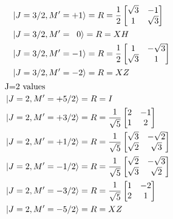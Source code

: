 \begin{subequations}
\begin{align}
\begin{split}
%
&\ket{J=3/2, M'=+1} = R = 
\frac{1}{2}
\begin{bmatrix}
\sqrt{3} &-1 \\
1 & \sqrt{3} \\
\end{bmatrix} \\
%
&\ket{J=3/2, M'=\;\;0} = R = XH \\
%
&\ket{J=3/2, M'=-1} = R = 
\frac{1}{2}
\begin{bmatrix}
1 &-\sqrt{3} \\
\sqrt{3} & 1 \\
\end{bmatrix} \\
%
&\ket{J=3/2, M'=-2} = R = XZ \\
\end{split} \\
\intertext{J=2 values}
\begin{split}
&\ket{J=2, M'=+5/2} = R = I \\
%
&\ket{J=2, M'=+3/2} = R = 
\frac{1}{\sqrt{5}}
\begin{bmatrix}
2 &-1 \\
1 & 2 \\
\end{bmatrix} \\
%
&\ket{J=2, M'=+1/2} = R = 
\frac{1}{\sqrt{5}}
\begin{bmatrix}
\sqrt{3} &-\sqrt{2} \\
\sqrt{2} & \sqrt{3} \\
\end{bmatrix} \\
%
&\ket{J=2, M'=-1/2} = R = 
\frac{1}{\sqrt{5}}
\begin{bmatrix}
\sqrt{2} &-\sqrt{3} \\
\sqrt{3} & \sqrt{2} \\
\end{bmatrix} \\
%
&\ket{J=2, M'=-3/2} = R = 
\frac{1}{\sqrt{5}}
\begin{bmatrix}
1 &-2 \\
2 & 1 \\
\end{bmatrix} \\
%
&\ket{J=2, M'=-5/2} = R = XZ \\
\end{split}
\label{eq:rvalues}
\end{align}
\end{subequations}
